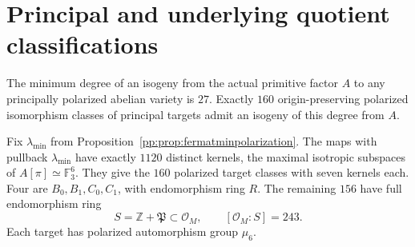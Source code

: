 \section{Principal and underlying quotient classifications}
\begin{theorem}
\label{pp:thm:fermatallquotients}
The minimum degree of an isogeny from the actual primitive factor $A$
to any principally polarized abelian variety is $27$. Exactly $160$
origin-preserving polarized isomorphism classes of principal targets
admit an isogeny of this degree from $A$.

Fix $\lambda_{\min}$ from Proposition~\ref{pp:prop:fermatminpolarization}.
The maps with pullback $\lambda_{\min}$ have exactly $1120$ distinct
kernels, the maximal isotropic subspaces of $A[\pi]\simeq\mathbb F_3^6$.
They give the $160$ polarized target classes with seven kernels each.
Four are $B_0,B_1,C_0,C_1$, with endomorphism ring $R$. The remaining
$156$ have full endomorphism ring
\[
 S=\mathbb Z+\mathfrak P\subset\mathcal O_M,\qquad
 [\mathcal O_M:S]=243.
\]
Each target has polarized automorphism group $\mu_6$.
\end{theorem}
